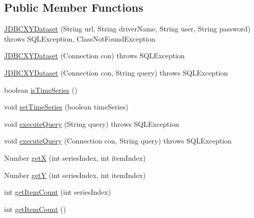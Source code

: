 \subsection*{Public Member Functions}
\begin{DoxyCompactItemize}
\item 
\mbox{\hyperlink{classorg_1_1jfree_1_1data_1_1jdbc_1_1_j_d_b_c_x_y_dataset_aab04c16cba109af1bbb2160a51f88297}{J\+D\+B\+C\+X\+Y\+Dataset}} (String url, String driver\+Name, String user, String password)  throws S\+Q\+L\+Exception, Class\+Not\+Found\+Exception 
\item 
\mbox{\hyperlink{classorg_1_1jfree_1_1data_1_1jdbc_1_1_j_d_b_c_x_y_dataset_a1cc8d49ea39aa015b03e24b97816a506}{J\+D\+B\+C\+X\+Y\+Dataset}} (Connection con)  throws S\+Q\+L\+Exception 
\item 
\mbox{\hyperlink{classorg_1_1jfree_1_1data_1_1jdbc_1_1_j_d_b_c_x_y_dataset_afdd30de451cb1515ccb314be5516eb96}{J\+D\+B\+C\+X\+Y\+Dataset}} (Connection con, String query)  throws S\+Q\+L\+Exception 
\item 
boolean \mbox{\hyperlink{classorg_1_1jfree_1_1data_1_1jdbc_1_1_j_d_b_c_x_y_dataset_adf1a30b0b84fc082de0a9b922cbbc47b}{is\+Time\+Series}} ()
\item 
void \mbox{\hyperlink{classorg_1_1jfree_1_1data_1_1jdbc_1_1_j_d_b_c_x_y_dataset_ab1499d012261ebffb4b5cae1923d881a}{set\+Time\+Series}} (boolean time\+Series)
\item 
void \mbox{\hyperlink{classorg_1_1jfree_1_1data_1_1jdbc_1_1_j_d_b_c_x_y_dataset_ab027debfa7099261834007c4371c9cc3}{execute\+Query}} (String query)  throws S\+Q\+L\+Exception 
\item 
void \mbox{\hyperlink{classorg_1_1jfree_1_1data_1_1jdbc_1_1_j_d_b_c_x_y_dataset_a20e6b9e145babdee661ece7acd451ec1}{execute\+Query}} (Connection con, String query)  throws S\+Q\+L\+Exception 
\item 
Number \mbox{\hyperlink{classorg_1_1jfree_1_1data_1_1jdbc_1_1_j_d_b_c_x_y_dataset_ae8e467b524a18e629f7777a5cd54e349}{getX}} (int series\+Index, int item\+Index)
\item 
Number \mbox{\hyperlink{classorg_1_1jfree_1_1data_1_1jdbc_1_1_j_d_b_c_x_y_dataset_a82d15ff790d019c18338037925dc8685}{getY}} (int series\+Index, int item\+Index)
\item 
int \mbox{\hyperlink{classorg_1_1jfree_1_1data_1_1jdbc_1_1_j_d_b_c_x_y_dataset_aab2e36e1765d6e8e80f41faa233fcdfb}{get\+Item\+Count}} (int series\+Index)
\item 
int \mbox{\hyperlink{classorg_1_1jfree_1_1data_1_1jdbc_1_1_j_d_b_c_x_y_dataset_aa347adfad669f076de8dbb6793441f15}{get\+Item\+Count}} ()

\end{DoxyCompactItemize}
